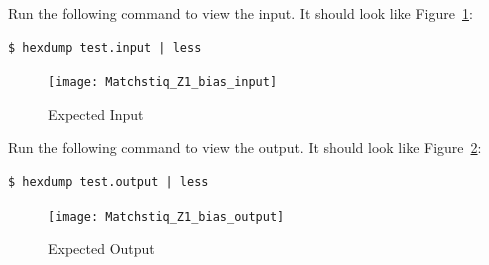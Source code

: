 \pagebreak
Run the following command to view the input. It should look like Figure~\ref{fig:inBias2}: \\
\begin{verbatim}
$ hexdump test.input | less
\end{verbatim}
\begin{figure}[H]
	\centerline{\texttt{[image: Matchstiq\_Z1\_bias\_input]}}
	\caption{Expected Input}
	\label{fig:inBias2}
\end{figure}

Run the following command to view the output. It should look like Figure~\ref{fig:outBias2}: \\
\begin{verbatim}
$ hexdump test.output | less
\end{verbatim}
\begin{figure}[H]
	\centerline{\texttt{[image: Matchstiq\_Z1\_bias\_output]}}
	\caption{Expected Output}
	\label{fig:outBias2}
\end{figure}

